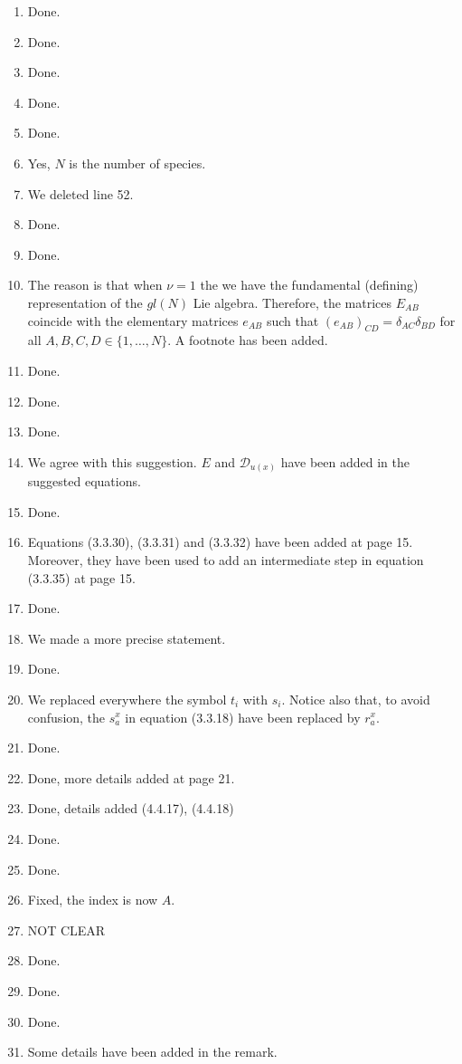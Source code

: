 \documentclass[10pt]{article}
\numberwithin{equation}{section}
\numberwithin{equation}{subsection}
\begin{document}
		\begin{enumerate}
			\item Done.
			\item Done.
			\item Done.
			\item Done.
			\item Done.
			\item Yes, $N$ is the number of species. 
			\item We deleted line 52.
			\item Done.
			\item Done.
			\item The reason is that when $\nu=1$ the we have the fundamental (defining) representation of the $gl(N)$ Lie algebra. Therefore, the matrices $E_{AB}$ coincide with the elementary matrices $e_{AB}$ such that $(e_{AB})_{CD}=\delta_{AC}\delta_{BD}$ for all $A,B,C,D\in\{1,\ldots,N\}$. A footnote has been added.
			\item Done.
			\item Done.
			\item Done.
			\item We agree with this suggestion. $E$ and $\mathcal{D}_{u(x)}$ have been added in the suggested equations.
			\item Done.
			\item Equations (3.3.30), (3.3.31) and (3.3.32) have been added at page 15. Moreover, they have been used to add an intermediate step in equation (3.3.35) at page 15.
			\item Done.
			\item We made a more precise statement. 
			\item Done.
			\item We replaced everywhere the symbol $t_{i}$ with $s_{i}$. Notice also that, to avoid confusion, the $s_{a}^{x}$ in equation (3.3.18) have been replaced by $r_{a}^{x}$.
			\item Done. 
			\item Done, more details added at page 21. 
			\item Done, details added (4.4.17), (4.4.18)
			\item Done.
			\item Done.
			\item Fixed, the index is now $A$.
			\item NOT CLEAR
			\item Done.
			\item Done.
			\item Done.
			\item Some details have been added in the remark.

\end{enumerate}
\end{document}

